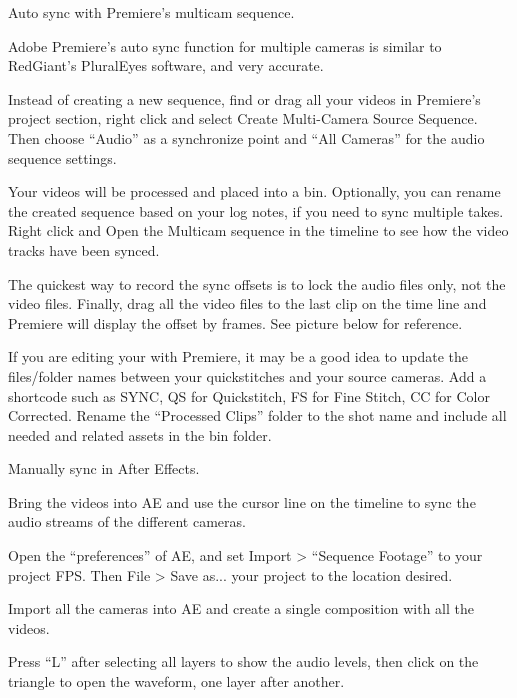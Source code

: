 \begin{fullwidth}
\clearpage
{\large Auto sync with Premiere’s multicam sequence. \par}

Adobe Premiere’s auto sync function for multiple cameras is similar to RedGiant’s PluralEyes software, and very accurate.

Instead of creating a new sequence, find or drag all your videos in Premiere’s project section, right click and select Create Multi-Camera Source Sequence. Then choose “Audio” as a synchronize point and “All Cameras” for the audio sequence settings.


Your videos will be processed and placed into a bin. Optionally, you can rename the created sequence based on your log notes, if you need to sync multiple takes. Right click and Open the Multicam sequence in the timeline to see how the video tracks have been synced.


The quickest way to record the sync offsets is to lock the audio files only, not the video files. Finally, drag all the video files to the last clip on the time line and Premiere will display the offset by frames. See picture below for reference.


\tip If you are editing your \textbf{} with Premiere, it may be a good idea to update the files/folder names between your quickstitches and your source cameras. Add a shortcode such as SYNC, QS for Quickstitch, FS for Fine Stitch, CC for Color Corrected. Rename the “Processed Clips” folder to the shot name and include all needed and related assets in the bin folder.

{\large Manually sync in After Effects. \par}

Bring the videos into AE and use the cursor line on the timeline to sync the audio streams of the different cameras.

Open the “preferences” of AE, and set Import > “Sequence Footage” to your project FPS. Then File > Save as... your project to the location desired.

Import all the cameras into AE and create a single composition with all the videos.

Press “L” after selecting all layers to show the audio levels, then click on the triangle to open the waveform, one layer after another. 


\end{fullwidth}
